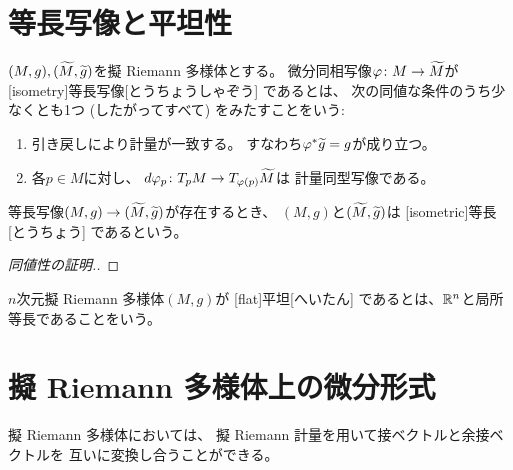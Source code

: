 \documentclass[report]{jlreq}
\begin{document}
%
\section{等長写像と平坦性}

\begin{definition}[等長写像]
    $(M, g), (\widetilde{M}, \widetilde{g})$を擬 Riemann 多様体とする。
    微分同相写像$\varphi \colon M \to \widetilde{M}$が
    [isometry]{等長写像}[とうちょうしゃぞう]
    であるとは、
    次の同値な条件のうち少なくとも1つ (したがってすべて) をみたすことをいう:
    \begin{enumerate}
        \item 引き戻しにより計量が一致する。
            すなわち$\varphi^* \widetilde{g} = g$が成り立つ。
        \item 各$p \in M$に対し、
            $d\varphi_p \colon T_p M \to T_{\varphi(p)} \widetilde{M}$は
            計量同型写像である。
    \end{enumerate}
    等長写像$(M, g) \to (\widetilde{M}, \widetilde{g})$が存在するとき、
    $(M, g)$と$(\widetilde{M}, \widetilde{g})$は
    [isometric]{等長}[とうちょう]
    であるという。
\end{definition}

\begin{proof}[同値性の証明.]
    \TODO{}
\end{proof}

\begin{definition}[局所等長]
    \TODO{}
\end{definition}

\begin{definition}[平坦]
    $n$次元擬 Riemann 多様体$(M, g)$が
    [flat]{平坦}[へいたん]
    であるとは、$\mathbb{R}^n$と局所等長であることをいう。
\end{definition}

%
\section{擬 Riemann 多様体上の微分形式}

擬 Riemann 多様体においては、
擬 Riemann 計量を用いて接ベクトルと余接ベクトルを
互いに変換し合うことができる。
\end{document}
